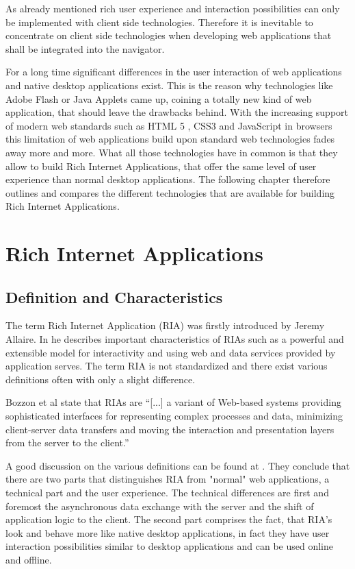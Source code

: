 As already mentioned rich user experience and interaction possibilities can only be implemented with client side technologies. Therefore it is inevitable to concentrate on client side technologies when developing web applications that shall be integrated into the navigator.

For a long time significant differences in the user interaction of web applications and native desktop applications exist.
This is the reason why technologies like Adobe Flash or Java Applets came up, coining a totally new kind of web application, that should leave the drawbacks behind. With the increasing support of modern web standards such as HTML 5 , CSS3 and JavaScript in browsers this limitation of web applications build upon standard web technologies fades away more and more. What all those technologies have in common is that they allow to build Rich Internet Applications, that offer the same level of user experience than normal desktop applications. The following chapter therefore outlines and compares the different technologies that are available for building Rich Internet Applications.


\section{Rich Internet Applications}

\subsection{Definition and Characteristics}

The term Rich Internet Application (RIA) was firstly introduced by Jeremy Allaire.
In \autocite[]{allaire_ria} he describes important characteristics of RIAs such as a powerful and extensible model for interactivity and using web and data services provided by application serves.
The term RIA is not standardized and there exist various definitions often with only a slight difference.

Bozzon et al state that RIAs are  \enquote{[...] a variant of Web-based systems providing sophisticated interfaces for representing complex processes and data, minimizing client-server data transfers and moving the interaction and presentation layers from the server to the client.} \autocite[]{ria-definition-1}
 
A good discussion on the various definitions can be found at \autocite[]{ria-state-of-the-art}.
They conclude that there are two parts that distinguishes RIA from "normal" web applications, a technical part and the user experience.
The technical differences are first and foremost the asynchronous data exchange with the server and the shift of application logic to the client.
The second part comprises the fact, that RIA's look and behave more like native desktop applications, in fact they have user interaction possibilities similar to desktop applications and can be used online and offline.
 

